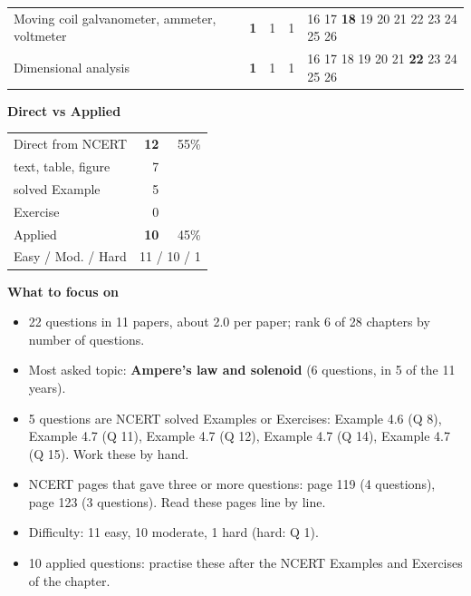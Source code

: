 {\begin{tabularx}{\linewidth}{@{}>{\raggedright\arraybackslash}Xrrrl@{}}
Moving coil galvanometer, ammeter, voltmeter & \textbf{1} & 1 & 1 & {\scriptsize {\color{gray!45}16} {\color{gray!45}17} \textbf{18} {\color{gray!45}19} {\color{gray!45}20} {\color{gray!45}21} {\color{gray!45}22} {\color{gray!45}23} {\color{gray!45}24} {\color{gray!45}25} {\color{gray!45}26}}\\
Dimensional analysis & \textbf{1} & 1 & 1 & {\scriptsize {\color{gray!45}16} {\color{gray!45}17} {\color{gray!45}18} {\color{gray!45}19} {\color{gray!45}20} {\color{gray!45}21} \textbf{22} {\color{gray!45}23} {\color{gray!45}24} {\color{gray!45}25} {\color{gray!45}26}}\\
\bottomrule\end{tabularx}}\par\medskip
\begin{minipage}[t]{0.34\linewidth}{\small\textbf{\color{crimson}Direct vs Applied}\par\smallskip
\begin{tabular}{@{}lrr@{}}\toprule
Direct from NCERT & \textbf{12} & 55\%\\
\quad text, table, figure & 7 &\\
\quad solved Example & 5 &\\
\quad Exercise & 0 &\\
Applied & \textbf{10} & 45\%\\\midrule
Easy / Mod. / Hard & \multicolumn{2}{r}{11 / 10 / 1}\\\bottomrule
\end{tabular}}\end{minipage}\hfill
\begin{minipage}[t]{0.63\linewidth}{\small\textbf{\color{crimson}What to focus on}\par\smallskip
\begin{itemize}[leftmargin=1.1em,itemsep=1pt,topsep=0pt]
\item 22 questions in 11 papers, about 2.0 per paper; rank 6 of 28 chapters by number of questions.
\item Most asked topic: \textbf{Ampere's law and solenoid} (6 questions, in 5 of the 11 years).
\item 5 questions are NCERT solved Examples or Exercises: Example 4.6 (Q 8), Example 4.7 (Q 11), Example 4.7 (Q 12), Example 4.7 (Q 14), Example 4.7 (Q 15). Work these by hand.
\item NCERT pages that gave three or more questions: page 119 (4 questions), page 123 (3 questions). Read these pages line by line.
\item Difficulty: 11 easy, 10 moderate, 1 hard (hard: Q 1).
\item 10 applied questions: practise these after the NCERT Examples and Exercises of the chapter.
\end{itemize}}\end{minipage}\par
